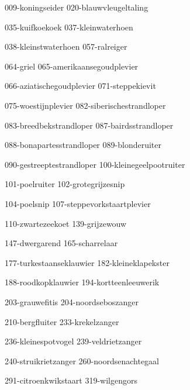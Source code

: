 

\begin{figure*}[h!]
    \centering
    \subfig
    {009-koningseider}
    {020-blauwvleugeltaling}

    \subfig
    {035-kuifkoekoek}
    {037-kleinwaterhoen}

    \subfig
    {038-kleinstwaterhoen}
    {057-ralreiger}
    
    \subfig
    {064-griel}
    {065-amerikaansegoudplevier}

    \subfig
    {066-aziatischegoudplevier}
    {071-steppekievit}

    \subfig
    {075-woestijnplevier}
    {082-siberischestrandloper}
\end{figure*}


\begin{figure*}[h!]
    \centering
    \subfig
    {083-breedbekstrandloper}
    {087-bairdsstrandloper}

    \subfig
    {088-bonapartesstrandloper}
    {089-blonderuiter}

    \subfig
    {090-gestreeptestrandloper}
    {100-kleinegeelpootruiter}

    \subfig
    {101-poelruiter}
    {102-grotegrijzesnip}

    \subfig
    {104-poelsnip}
    {107-steppevorkstaartplevier}

    \subfig
    {110-zwartezeekoet}
    {139-grijzewouw}
\end{figure*}

\begin{figure*}[h!]
    \centering
    \subfig
    {147-dwergarend}
    {165-scharrelaar}

    \subfig
    {177-turkestaanseklauwier}
    {182-kleineklapekster}

    \subfig
    {188-roodkopklauwier}
    {194-kortteenleeuwerik}

    \subfig
    {203-grauwefitis}
    {204-noordseboszanger}

    \subfig
    {210-bergfluiter}
    {233-krekelzanger}

    \subfig
    {236-kleinespotvogel}
    {239-veldrietzanger}
\end{figure*}

\begin{figure*}[h!]
    \centering
    \subfig
    {240-struikrietzanger}
    {260-noordsenachtegaal}

    \subfig
    {291-citroenkwikstaart}
    {319-wilgengors}
\end{figure*}